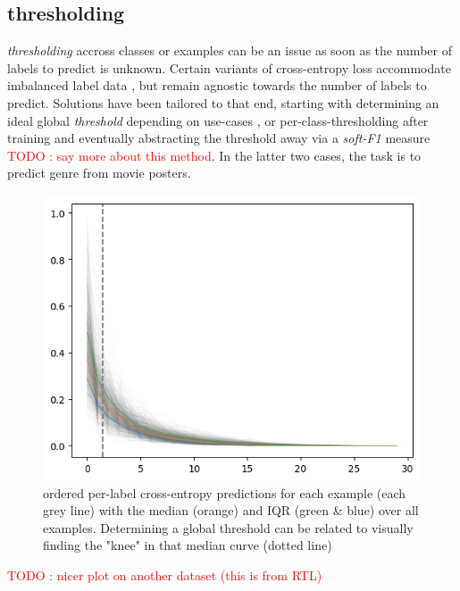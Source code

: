 \documentclass[sigconf,natbib,screen=true,review=true,anonymous]{acmart}
\newcommand\todo[1]{\textcolor{red}{TODO : #1}}
\begin{document}

\subsection{thresholding}
\label{sec:org8295f09}

\emph{thresholding} accross classes or examples can be an issue as soon as the number of labels to predict is unknown. Certain variants of cross-entropy loss accommodate imbalanced label data  \cite{focalLoss}, but remain agnostic towards the number of labels to predict. Solutions have been tailored to that end, starting with determining an ideal global \emph{threshold} depending on use-cases \cite{threshForF1}, or per-class-thresholding after training \cite{moviePosters} and eventually abstracting the threshold away via a \emph{soft-F1} measure \cite{softF1} \todo{say more about this method}. In the latter two cases, the task is to predict genre from movie posters.

\begin{figure}[htbp]
\centering
\includegraphics[width=.9\linewidth]{./images/knee.png}
\caption{\label{fig:knee}
ordered per-label cross-entropy predictions for each example (each grey line) with the median (orange) and IQR (green \& blue) over all examples. Determining a global threshold can be related to visually finding the "knee" in that median curve (dotted line)}
\end{figure}

\todo{nicer plot on another dataset (this is from RTL)}
\end{document}

